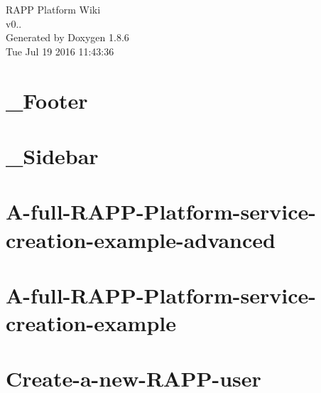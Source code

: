 \documentclass[twoside]{book}
\newcommand{\clearemptydoublepage}{%
  \newpage{\pagestyle{empty}\cleardoublepage}%
}
\begin{document}
\hypersetup{pageanchor=false}
\begin{titlepage}
\vspace*{7cm}
\begin{center}%
{\Large R\-A\-P\-P Platform Wiki \\[1ex]\large v0.. }\\
\vspace*{1cm}
{\large Generated by Doxygen 1.8.6}\\
\vspace*{0.5cm}
{\small Tue Jul 19 2016 11:43:36}\\
\end{center}
\end{titlepage}
\clearemptydoublepage
\tableofcontents
\clearemptydoublepage
{}
\hypersetup{pageanchor=true}

\chapter{\-\_\-\-Footer}
\label{md_rapp-platform_8wiki__Footer}
\hypertarget{md_rapp-platform_8wiki__Footer}{}

\chapter{\-\_\-\-Sidebar}
\label{md_rapp-platform_8wiki__Sidebar}
\hypertarget{md_rapp-platform_8wiki__Sidebar}{}

\chapter{A-\/full-\/\-R\-A\-P\-P-\/\-Platform-\/service-\/creation-\/example-\/advanced}
\label{md_rapp-platform_8wiki_A-full-RAPP-Platform-service-creation-example-advanced}
\hypertarget{md_rapp-platform_8wiki_A-full-RAPP-Platform-service-creation-example-advanced}{}

\chapter{A-\/full-\/\-R\-A\-P\-P-\/\-Platform-\/service-\/creation-\/example}
\label{md_rapp-platform_8wiki_A-full-RAPP-Platform-service-creation-example}
\hypertarget{md_rapp-platform_8wiki_A-full-RAPP-Platform-service-creation-example}{}

\chapter{Create-\/a-\/new-\/\-R\-A\-P\-P-\/user}
\label{md_rapp-platform_8wiki_Create-a-new-RAPP-user}
\hypertarget{md_rapp-platform_8wiki_Create-a-new-RAPP-user}{}

\end{document}
